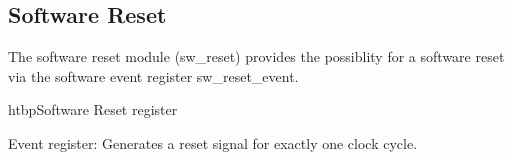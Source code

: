 
\subsection{Software Reset} \label{sec:framework:software_reset}
The software reset module (sw\_reset) provides the possiblity for a software reset via the software event register sw\_reset\_event.

\begin{register}{htbp}{Software Reset register}{}%
	\label{tcm_ctrl_reg}%
	\regnewline%

	\begin{regdesc}
	\begin{reglist}
		\item [sw\_reset\_event] Event register: Generates a reset signal for exactly one clock cycle.
	\end{reglist}
	\end{regdesc}
\end{register}

\clearpage

